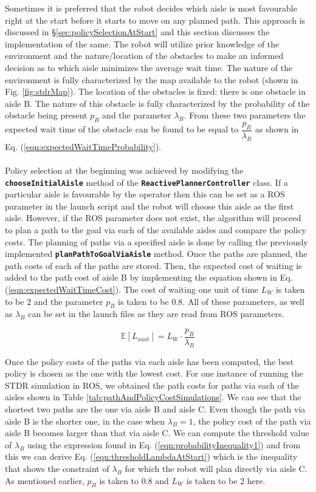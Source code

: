 \documentclass[a4paper,12pt]{article}
\begin{document}
		Sometimes it is preferred that the robot decides which aisle is most favourable right at the start before it starts to move on any planned path. This approach is discussed in \S \ref{sec:policySelectionAtStart} and this section discusses the implementation of the same. The robot will utilize prior knowledge of the environment and the nature/location of the obstacles to make an informed decision as to which aisle minimizes the average wait time. The nature of the environment is fully characterized by the map available to the robot (shown in Fig. \ref{fig:stdrMap}). The location of the obstacles is fixed: there is one obstacle in aisle B. The nature of this obstacle is fully characterized by the probability of the obstacle being present $p_B$ and the parameter $\lambda_B$. From these two parameters the expected wait time of the obstacle can be found to be equal to $\dfrac{p_B}{\lambda_B}$ as shown in Eq. (\ref{eqn:expectedWaitTimeProbability}).
		\\
		\\
		Policy selection at the beginning was achieved by modifying the \textbf{\texttt{chooseInitialAisle}} method of the \textbf{\texttt{ReactivePlannerController}} class. If a particular aisle is favourable by the operator then this can be set as a ROS parameter in the launch script and the robot will choose this aisle as the first aisle. However, if the ROS parameter does not exist, the algorithm will proceed to plan a path to the goal via each of the available aisles and compare the policy costs. The planning of paths via a specified aisle is done by calling the previously implemented \texttt{\textbf{planPathToGoalViaAisle}} method. Once the paths are planned, the path costs of each of the paths are stored. Then, the expected cost of waiting is added to the path cost of aisle B by implementing the equation shown in Eq. (\ref{eqn:expectedWaitTimeCost}). The cost of waiting one unit of time $L_W$ is taken to be $2$ and the parameter $p_B$ is taken to be $0.8$. All of these parameters, as well as $\lambda_B$ can be set in the launch files as they are read from ROS parameters.
		
		\begin{equation}
			\mathbb{E}[L_{wait}]=L_W \cdot \frac{p_B}{\lambda_B}
		\label{eqn:expectedWaitTimeCost}
		\end{equation}
		
		Once the policy costs of the paths via each aisle has been computed, the best policy is chosen as the one with the lowest cost. For one instance of running the STDR simulation in ROS, we obtained the path costs for paths via each of the aisles shown in Table \ref{tab:pathAndPolicyCostSimulations}. We can see that the shortest two paths are the one via aisle B and aisle C. Even though the path via aisle B is the shorter one, in the case when $\lambda_B=1$, the policy cost of the path via aisle B becomes larger than that via aisle C. We can compute the threshold value of $\lambda_B$ using the expression found in Eq. (\ref{eqn:probabilityInequality1}) and from this we can derive Eq. (\ref{eqn:thresholdLambdaAtStart}) which is the inequality that shows the constraint of $\lambda_B$ for which the robot will plan directly via aisle C. As mentioned earlier, $p_B$ is taken to $0.8$ and $L_W$ is taken to be $2$ here.
		
\end{document}
